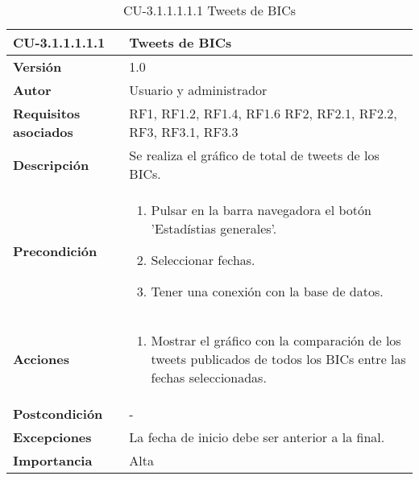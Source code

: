 \begin{table}[h!]
	\centering
	\begin{tabularx}{\linewidth}{ p{} p{} }
		\toprule
		\textbf{CU-3.1.1.1.1.1}    & \textbf{Tweets de BICs}\\
		\toprule
		\textbf{Versión}              & 1.0    \\
		\textbf{Autor}                & Usuario y administrador \\
		\textbf{Requisitos asociados} & RF1, RF1.2, RF1.4, RF1.6 RF2, RF2.1, RF2.2, RF3, RF3.1, RF3.3\\
		\textbf{Descripción}          & Se realiza el gráfico de total de tweets de los BICs.  \\
        \textbf{Precondición}         & 
        \begin{enumerate}
			\def\labelenumi{\arabic{enumi}.}
			\tightlist
                \item Pulsar en la barra navegadora el botón 'Estadístias generales'.
                \item Seleccionar fechas. 
			\item Tener una conexión con la base de datos.
            
		\end{enumerate}\\
		
		\textbf{Acciones}             &
		\begin{enumerate}
			\def\labelenumi{\arabic{enumi}.}
			\tightlist
			\item Mostrar el gráfico con la comparación de los tweets publicados de todos los BICs entre las fechas seleccionadas.
            
		\end{enumerate}\\
		\textbf{Postcondición}        &  - \\
		\textbf{Excepciones}          &  La fecha de inicio debe ser anterior a la final.\\
		\textbf{Importancia}          & Alta \\
		\bottomrule
	\end{tabularx}
	\caption{CU-3.1.1.1.1.1 Tweets de BICs}
\end{table}
